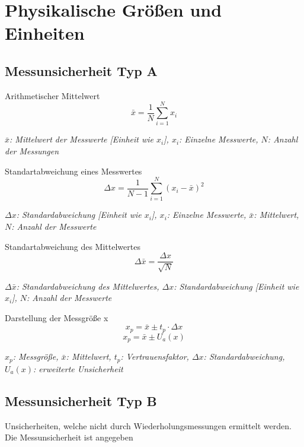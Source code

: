 \documentclass[a5paper,10pt]{article}
\newenvironment{displayformula}
{
	\begin{framed}
		\color{formulaColor}
	}
	{\end{framed}}
\newcommand{\formulalegend}[1]{%
	\par\vspace{0.5ex}%
	{{\color{legendColor}\RaggedRight\small\textit{#1}}}%
	\par\vspace{1.5ex}%
}
\begin{document}
	\tableofcontents
	\newpage
	
	\section{Physikalische Größen und Einheiten}
	
	\subsection{Messunsicherheit Typ A}
	
	\begin{displayformula}
		Arithmetischer Mittelwert
		\[
		\bar{x} = \frac{1}{N} \sum_{i=1}^{N} x_i
		\]
	\end{displayformula}
	\formulalegend{
		\( \bar{x} \): Mittelwert der Messwerte [Einheit wie \( x_i \)], \( x_i \): Einzelne Messwerte, \( N \): Anzahl der Messungen
	}
	
	\begin{displayformula}
		Standartabweichung eines Messwertes
		\[
		\Delta x = \frac{1}{N - 1} \sum_{i = 1}^{N} (x_i - \bar{x})^2
		\]	
	\end{displayformula}
	\formulalegend{
		\( \Delta x \): Standardabweichung [Einheit wie \( x_i \)], \( x_i \): Einzelne Messwerte, \( \bar{x} \): Mittelwert, \( N \): Anzahl der Messwerte
	}
	
	\begin{displayformula}
		Standartabweichung des Mittelwertes
		\[
		\Delta \bar{x} = \frac{\Delta x}{\sqrt{N}} 
		\]	
	\end{displayformula}
	\formulalegend{
		\( \Delta \bar{x} \): Standardabweichung des Mittelwertes, \( \Delta x \): Standardabweichung [Einheit wie \( x_i \)], \( N \): Anzahl der Messwerte
	}
	
	\begin{displayformula}
		Darstellung der Messgröße x
		\[
		x_p = \bar{x} \pm t_p \cdot \Delta x
		\]
		\[
		x_p = \bar{x} \pm U_a (x)
		\]
	\end{displayformula}
	\formulalegend{
		\( x_p \): Messgröße, \( \bar{x} \): Mittelwert, \( t_p \): Vertrauensfaktor, \( \Delta x \): Standardabweichung, \( U_a(x) \): erweiterte Unsicherheit
	}
	
	\subsection{Messunsicherheit Typ B}
	\begin{displayformula}
		Unsicherheiten, welche nicht durch Wiederholungsmessungen ermittelt werden. \\ Die Messunsicherheit ist angegeben
	\end{displayformula}
	
\end{document}
